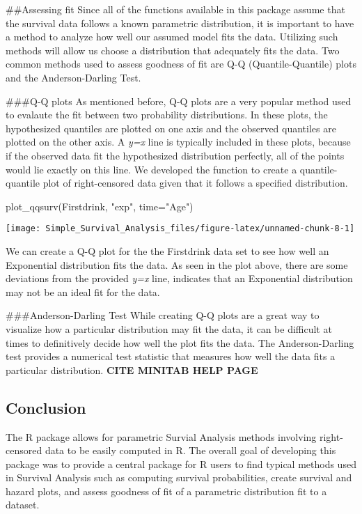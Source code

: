 \#\#Assessing fit Since all of the functions available in this package
assume that the survival data follows a known parametric distribution,
it is important to have a method to analyze how well our assumed model
fits the data. Utilizing such methods will allow us choose a
distribution that adequately fits the data. Two common methods used to
assess goodness of fit are Q-Q (Quantile-Quantile) plots and the
Anderson-Darling Test.

\#\#\#Q-Q plots As mentioned before, Q-Q plots are a very popular method
used to evalaute the fit between two probability distributions. In these
plots, the hypothesized quantiles are plotted on one axis and the
observed quantiles are plotted on the other axis. A \emph{y=x} line is
typically included in these plots, because if the observed data fit the
hypothesized distribution perfectly, all of the points would lie exactly
on this line. We developed the  function to create a
quantile-quantile plot of right-censored data given that it follows a
specified distribution.

\begin{Schunk}
\begin{Sinput}
plot_qqsurv(Firstdrink, "exp", time="Age")
\end{Sinput}

\texttt{[image: Simple\_Survival\_Analysis\_files/figure-latex/unnamed-chunk-8-1]} \end{Schunk}

We can create a Q-Q plot for the the Firstdrink data set to see how well
an Exponential distribution fits the data. As seen in the plot above,
there are some deviations from the provided \emph{y=x} line, indicates
that an Exponential distribution may not be an ideal fit for the data.

\#\#\#Anderson-Darling Test While creating Q-Q plots are a great way to
visualize how a particular distribution may fit the data, it can be
difficult at times to definitively decide how well the plot fits the
data. The Anderson-Darling test provides a numerical test statistic that
measures how well the data fits a particular distribution. \textbf{CITE
MINITAB HELP PAGE}

\hypertarget{conclusion}{%
\subsection{Conclusion}\label{conclusion}}

The R package  allows for parametric Survial Analysis
methods involving right-censored data to be easily computed in R. The
overall goal of developing this package was to provide a central package
for R users to find typical methods used in Survival Analysis such as
computing survival probabilities, create survival and hazard plots, and
assess goodness of fit of a parametric distribution fit to a dataset.

